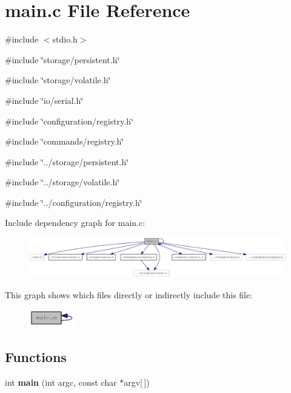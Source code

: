 \section{main.c File Reference}
\label{d0/d29/main_8c}
{\ttfamily \#include $<$stdio.h$>$}\par
{\ttfamily \#include \char`\"{}storage/persistent.h\char`\"{}}\par
{\ttfamily \#include \char`\"{}storage/volatile.h\char`\"{}}\par
{\ttfamily \#include \char`\"{}io/serial.h\char`\"{}}\par
{\ttfamily \#include \char`\"{}configuration/registry.h\char`\"{}}\par
{\ttfamily \#include \char`\"{}commands/registry.h\char`\"{}}\par
{\ttfamily \#include \char`\"{}../storage/persistent.h\char`\"{}}\par
{\ttfamily \#include \char`\"{}../storage/volatile.h\char`\"{}}\par
{\ttfamily \#include \char`\"{}../configuration/registry.h\char`\"{}}\par
Include dependency graph for main.c:\nopagebreak
\begin{figure}[H]
\begin{center}
\leavevmode
\includegraphics[width=420pt]{d4/d10/main_8c__incl}
\end{center}
\end{figure}
This graph shows which files directly or indirectly include this file:\nopagebreak
\begin{figure}[H]
\begin{center}
\leavevmode
\includegraphics[width=56pt]{d6/d74/main_8c__dep__incl}
\end{center}
\end{figure}
\subsection*{Functions}
\begin{DoxyCompactItemize}
\item 
int {\bf main} (int argc, const char $\ast$argv[$\,$])
\end{DoxyCompactItemize}


